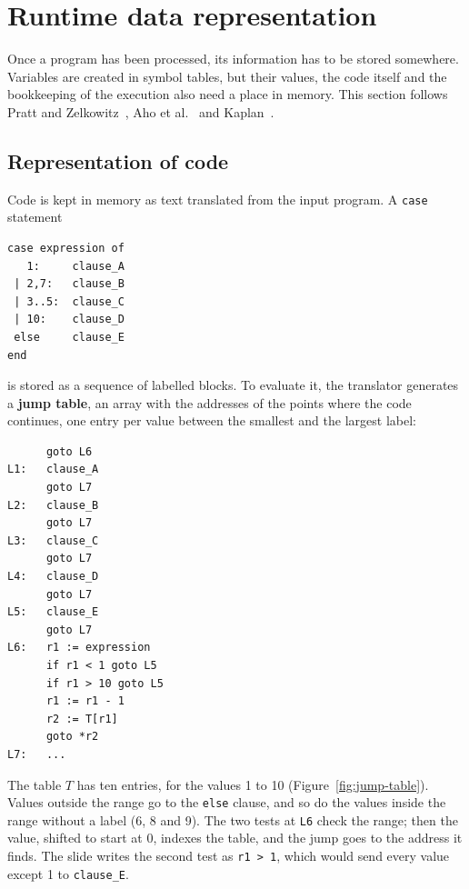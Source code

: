 \section{Runtime data representation}
\label{sec:representation}

Once a program has been processed, its information has to be stored somewhere.
Variables are created in symbol tables, but their values, the code itself and
the bookkeeping of the execution also need a place in memory. This section
follows Pratt and Zelkowitz~\cite[Ch.~10]{pratt2001design}, Aho et
al.~\cite[Ch.~7]{aho2007compilers} and Kaplan~\cite[Ch.~6, 9]{kaplan1994little}.

\subsection{Representation of code}

Code is kept in memory as text translated from the input program. A
\texttt{case} statement
\begin{lstlisting}
case expression of
   1:     clause_A
 | 2,7:   clause_B
 | 3..5:  clause_C
 | 10:    clause_D
 else     clause_E
end
\end{lstlisting}
is stored as a sequence of labelled blocks. To evaluate it, the translator
generates a \textbf{jump table}, an array with the addresses of the points
where the code continues, one entry per value between the smallest and the
largest label:
\begin{lstlisting}
      goto L6
L1:   clause_A
      goto L7
L2:   clause_B
      goto L7
L3:   clause_C
      goto L7
L4:   clause_D
      goto L7
L5:   clause_E
      goto L7
L6:   r1 := expression
      if r1 < 1 goto L5
      if r1 > 10 goto L5
      r1 := r1 - 1
      r2 := T[r1]
      goto *r2
L7:   ...
\end{lstlisting}
The table $T$ has ten entries, for the values 1 to 10
(Figure~\ref{fig:jump-table}). Values outside the range go to the
\texttt{else} clause, and so do the values inside the range without a label
(6, 8 and 9). The two tests at \texttt{L6} check the range; then the value,
shifted to start at 0, indexes the table, and the jump goes to the address it
finds. The slide writes the second test as \texttt{r1 > 1}, which would send
every value except 1 to \texttt{clause\_E}.

